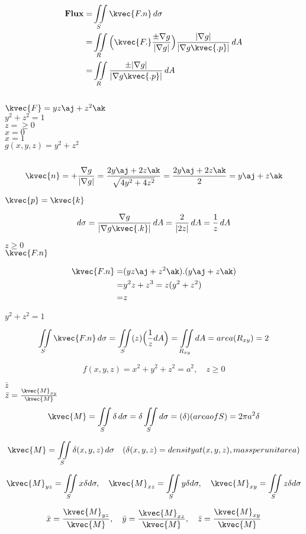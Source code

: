 \begin{align}
\textbf{Flux}=&\iint\limits_{S}\kvec{F.n}\,d\sigma\\
=&\iint\limits_{R}\Big(\kvec{F.}\frac{\pm \nabla g}{|\nabla g|}\Big) \frac{|\nabla g|}{|\nabla g\kvec{.p}|}\,dA\\
=&\iint\limits_{R}\frac{\pm|\nabla g|}{|\nabla g\kvec{.p}|}\,dA
\end{align}
\\
\(\kvec{F}=yz\aj+z^2\ak\)\\
\(y^2+z^2=1\)\\
\(z=\ge 0\)\\
\(x=0\)\\
\(x=1\)\\
\(g(x,y,z)=y^2+z^2\)\\
\\
\[\kvec{n}=+\frac{\nabla g}{|\nabla g|}=\frac{2y\aj+2z\ak}{\sqrt{4y^2+4z^2}}=\frac{2y\aj+2z\ak}{2}= y\aj+z\ak\]

\(\kvec{p}=\kvec{k}\)

\[d\sigma=\frac{\nabla g}{|\nabla g\kvec{.k}|}\,dA=\frac{2}{|2z|}\,dA= \frac{1}{z}\,dA\]

\(z\ge 0\)
\\
\(\kvec{F.n}\)

\begin{align*}
\kvec{F.n}=&(yz\aj+z^2\ak).(y\aj+z\ak)\\
=& y^2z+z^3=z(y^2+z^2)\\
=& z
\end{align*}

\(y^2+z^2=1\)

\[\iint\limits_{S} \kvec{F.n}\,d\sigma=\iint\limits_{S}(z)\Big(\frac{1}{z}dA\Big)=\iint\limits_{R_{xy}}dA= area(R_{xy})=2\]

\[f(x,y,z)= x^2+y^2+z^2=a^2, \quad z\ge 0\]

\(\bar{z}\)
\\
\(\bar{z}= \frac{\kvec{M}_{xy}}{\kvec{M}}\)
\\
\[\kvec{M}=\iint\limits_{S}\delta \, d\sigma=\delta \iint\limits_{S} d\sigma=(\delta)(area of S)= 2\pi a^2\delta\]

\[\kvec{M}=\iint\limits_{S}\delta(x,y,z)\,d\sigma \quad (\delta(x,y,z)=density at (x,y,z),mass per unit area)\]

\[\kvec{M}_{yz}= \iint\limits_{S} x\delta d\sigma, \quad \kvec{M}_{xz}=\iint\limits_{S} y\delta d\sigma, \quad \kvec{M}_{xy}= \iint\limits_{S} z\delta d\sigma\]

\[\bar{x}=\frac{\kvec{M}_{yz}}{\kvec{M}}, \quad \bar{y}=\frac{\kvec{M}_{xz}}{\kvec{M}}, \quad\bar{z}=\frac{\kvec{M}_{xy}}{\kvec{M}}\]

